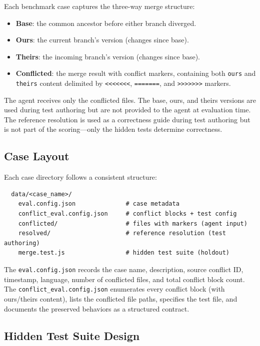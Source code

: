 \documentclass[11pt,a4paper]{article}
\begin{document}
Each benchmark case captures the three-way merge structure:

\begin{itemize}[leftmargin=2em]
\item \textbf{Base}: the common ancestor before either branch diverged.
\item \textbf{Ours}: the current branch's version (changes since base).
\item \textbf{Theirs}: the incoming branch's version (changes since base).
\item \textbf{Conflicted}: the merge result with conflict markers, containing both \texttt{ours} and \texttt{theirs} content delimited by \texttt{<{}<{}<{}<{}<{}<{}<}, \texttt{=======}, and \texttt{>{}>{}>{}>{}>{}>{}>{}} markers.
\end{itemize}

The agent receives only the conflicted files. The base, ours, and theirs versions are used during test authoring but are not provided to the agent at evaluation time. The reference resolution is used as a correctness guide during test authoring but is not part of the scoring---only the hidden tests determine correctness.

\subsection{Case Layout}

Each case directory follows a consistent structure:

\begin{verbatim}
  data/<case_name>/
    eval.config.json              # case metadata
    conflict_eval.config.json     # conflict blocks + test config
    conflicted/                   # files with markers (agent input)
    resolved/                     # reference resolution (test authoring)
    merge.test.js                 # hidden test suite (holdout)
\end{verbatim}

The \texttt{eval.config.json} records the case name, description, source conflict ID, timestamp, language, number of conflicted files, and total conflict block count. The \texttt{conflict\_eval.config.json} enumerates every conflict block (with ours/theirs content), lists the conflicted file paths, specifies the test file, and documents the preserved behaviors as a structured contract.

\subsection{Hidden Test Suite Design}
\end{document}
